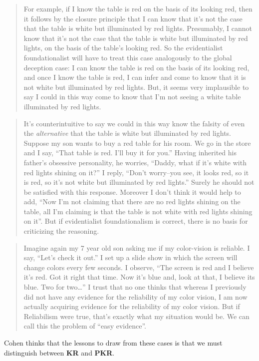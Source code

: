 \begin{quote}
For example, if I know the table is red on the basis of its looking red, then it follows by the closure principle that I can know that it's not the case that the table is white but illuminated by red lights. Presumably, I cannot know that it's not the case that the table is white but illuminated by red lights, on the basis of the table's looking red. So the evidentialist foundationalist will have to treat this case analogously to the global deception case: I can know the table is red on the basis of its looking red, and once I know the table is red, I can infer and come to know that it is not white but illuminated by red lights. But, it seems very implausible to say I could in this way come to know that I'm not seeing a white table illuminated by red lights. ~\citep[313]{Cohen2002}
\end{quote}
\begin{quote}
It's counterintuitive to say we could in this way know the falsity of even the \emph{alternative} that the table is white but illuminated by red lights. Suppose my son wants to buy a red table for his room. We go in the store and I say, ``That table is red. I'll buy it for you.'' Having inherited his father's obsessive personality, he worries, ``Daddy, what if it's white with red lights shining on it?'' I reply, ``Don't worry--you see, it looks red, so it is red, so it's not white but illuminated by red lights.'' Surely he should not be satisfied with this response. Moreover I don't think it would help to add, ``Now I'm not claiming that there are no red lights shining on the table, all I'm claiming is that the table is not white with red lights shining on it''. But if evidentialist foundationalism is correct, there is no basis for criticizing the reasoning.~\citep[314]{Cohen2002}
\end{quote}
\begin{quote}
Imagine again my 7 year old son asking me if my color-vision is reliable. I say, ``Let's check it out.'' I set up a slide show in which the screen will change colors every few seconds. I observe, ``The screen is red and I believe it's red. Got it right that time. Now it's blue and, look at that, I believe its blue. Two for two{\ldots}'' I trust that no one thinks that whereas I previously did not have any evidence for the reliability of my color vision, I am now actually acquiring evidence for the reliability of my color vision. But if Reliabilism were true, that's exactly what my situation would be. We can call this the problem of ``easy evidence''. ~\citep[317]{Cohen2002}
\end{quote}
Cohen thinks that the lessons to draw from these cases is that we must distinguish between \textbf{KR} and \textbf{PKR}.

